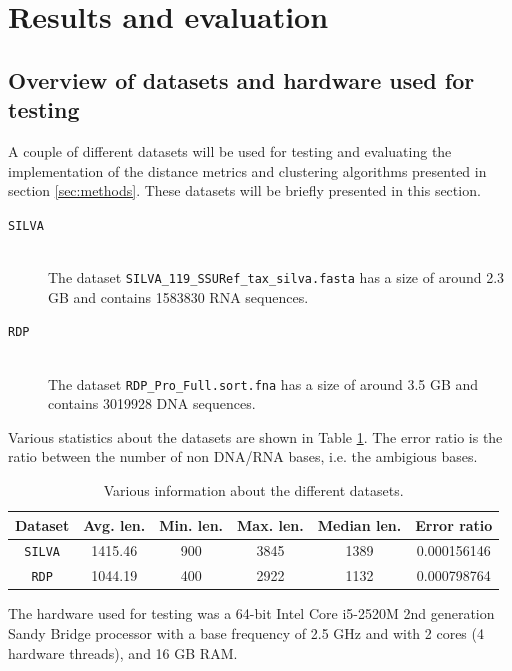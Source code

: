 \section{Results and evaluation} \label{sec:results}

\subsection{Overview of datasets and hardware used for testing}
\label{sec:overview_of_datasets}

A couple of different datasets will be used for testing and evaluating the
implementation of the distance metrics and clustering algorithms presented in
section \ref{sec:methods}. These datasets will be briefly presented in this
section.

\begin{description}
  \item[\texttt{SILVA}] \hfill \\
    The dataset \texttt{SILVA\_119\_SSURef\_tax\_silva.fasta} has a size of
    around 2.3 GB and contains \num{1583830} RNA sequences.

  \item[\texttt{RDP}] \hfill \\
    The dataset \texttt{RDP\_Pro\_Full.sort.fna} has a size of around 3.5 GB
    and contains \num{3019928} DNA sequences.
\end{description}

Various statistics about the datasets are shown in Table \ref{tab:data_stats}.
The error ratio is the ratio between the number of non DNA/RNA bases, i.e. the
ambigious bases.

\begin{table}[H]
  \centering
  \begin{tabular}{c | c | c | c | c | c}
    Dataset        & Avg. len. & Min. len. & Max. len. & Median len. & Error ratio \\
    \hline\hline
    \texttt{SILVA} & \num{1415.46}  & \num{900} & \num{3845} & \num{1389}       & 0.000156146 \\
    \texttt{RDP}   & \num{1044.19}  & \num{400} & \num{2922} & \num{1132}       & 0.000798764 \\
  \end{tabular}
  \caption{Various information about the different datasets.}
  \label{tab:data_stats}
\end{table}

The hardware used for testing was a 64-bit Intel Core i5-2520M 2nd generation
Sandy Bridge processor with a base frequency of 2.5 GHz and with 2 cores (4
hardware threads), and 16 GB RAM.


